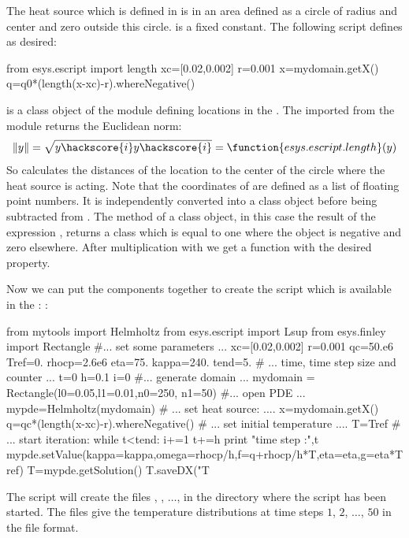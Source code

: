 The heat source  which is defined in  is 
in an area defined as a circle of radius  and center  and zero outside this circle.
 is a fixed constant. The following script defines  as desired:  
\begin{python}
from esys.escript import length
xc=[0.02,0.002]
r=0.001
x=mydomain.getX()
q=q0*(length(x-xc)-r).whereNegative()
\end{python}
 is a \Data class object of
the \escript module defining locations in the \Domain {}.
The  imported from the \escript module returns the 
Euclidean norm:
\begin{equation}\label{DIFFUSION HELM EQ 3aba}
\|y\|=\sqrt{
y\hackscore{i}
y\hackscore{i}
} = \function{esys.escript.length}(y)
\end{equation}
So  calculates the distances  
of the location  to the center of the circle  where the heat source is acting.
Note that the coordinates of  are defined as a list of floating point numbers. It is independently
converted into a \Data class object before being subtracted from . The method  of
a \Data class object, in this case the result of the expression 
, returns a \Data class which is equal to one where the object is negative and
zero elsewhere. After multiplication with  we get a function with the desired property.

Now we can put the components together to create the script  which is available in the \ExampleDirectory:
:
\begin{python}
from mytools import Helmholtz
from esys.escript import Lsup
from esys.finley import Rectangle
#... set some parameters ...
xc=[0.02,0.002]
r=0.001
qc=50.e6
Tref=0.
rhocp=2.6e6
eta=75.
kappa=240.
tend=5.
# ... time, time step size and counter ...
t=0
h=0.1
i=0
#... generate domain ...
mydomain = Rectangle(l0=0.05,l1=0.01,n0=250, n1=50)
#... open PDE ...
mypde=Helmholtz(mydomain)
# ... set heat source: ....
x=mydomain.getX()
q=qc*(length(x-xc)-r).whereNegative()
# ... set initial temperature ....
T=Tref
# ... start iteration:
while t<tend:
      i+=1
      t+=h
      print "time step :",t
      mypde.setValue(kappa=kappa,omega=rhocp/h,f=q+rhocp/h*T,eta=eta,g=eta*Tref)
      T=mypde.getSolution()
      T.saveDX("T%
\end{python}
The script will create the files ,
 , $\ldots$,  in the directory where the script has been started. The files give the 
temperature distributions at time steps $1$, $2$, $\ldots$, $50$ in the \OpenDX file format. 

